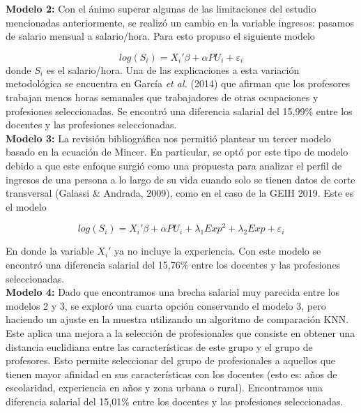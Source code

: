 \documentclass[a4paper]{article}
\begin{document}
\textbf{Modelo 2:} Con el ánimo superar algunas de las limitaciones del estudio mencionadas anteriormente, se realizó un cambio en la variable ingresos: pasamos de salario mensual a salario/hora. Para esto propuso el siguiente modelo

\begin{equation}
log(S_{i})=X_{i}'\beta + \alpha PU_{i}+\varepsilon_{i}
\end{equation}
donde $S_i$ es el salario/hora. Una de las explicaciones a esta variación metodológica se encuentra en García \textit{et al.} (2014) que afirman que los profesores trabajan menos horas semanales que trabajadores de otras ocupaciones y profesiones seleccionadas. Se encontró una diferencia salarial del 15,99\% entre los docentes y las profesiones seleccionadas.\\

\textbf{Modelo 3:} La revisión bibliográfica nos permitió plantear un tercer modelo basado en la ecuación de Mincer. En particular, se optó por este tipo de modelo debido a que este enfoque surgió como una propuesta para analizar el perfil de ingresos de una persona a lo largo de su vida cuando solo se tienen datos de corte transversal (Galassi \& Andrada, 2009), como en el caso de la GEIH 2019. Este es el modelo

\begin{equation}
log(S_{i})=X_{i}'\beta + \alpha PU_{i}+\lambda_{1}Exp^{2}+\lambda_{2}Exp+\varepsilon_{i}
\end{equation}

En donde la variable $X_{i}'$ ya no incluye la experiencia. Con este modelo se encontró una diferencia salarial del 15,76\% entre los docentes y las profesiones seleccionadas.\\

\textbf{Modelo 4:} Dado que encontramos una brecha salarial muy parecida entre los modelos 2 y 3, se exploró una cuarta opción conservando el modelo 3, pero haciendo un ajuste en la muestra utilizando un algoritmo de comparación KNN. Este aplica una mejora a la selección de profesionales que consiste en obtener una distancia euclidiana entre las características de este grupo y el grupo de profesores. Esto permite seleccionar del grupo de profesionales a aquellos que tienen mayor afinidad en sus características con los docentes (esto es: años de escolaridad, experiencia en años y zona urbana o rural). Encontramos una diferencia salarial del 15,01\% entre los docentes y las profesiones seleccionadas.\\
\end{document}
